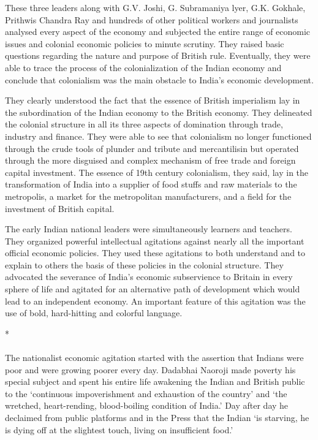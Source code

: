 These three leaders along with G.V. Joshi, G. Subramaniya lyer, G.K. Gokhale, Prithwis Chandra Ray and hundreds of other political workers and journalists analysed every aspect of the economy and subjected the entire range of economic issues and colonial economic policies to minute scrutiny. They raised basic questions regarding the nature and purpose of British rule. Eventually, they were able to trace the process of the colonialization of the Indian economy and conclude that colonialism was the main obstacle to India's economic development.

They clearly understood the fact that the essence of British imperialism lay in the subordination of the Indian economy to the British economy. They delineated the colonial structure in all its three aspects of domination through trade, industry and finance. They were able to see that colonialism no longer functioned through the crude tools of plunder and tribute and mercantilisin but operated through the more disguised and complex mechanism of free trade and foreign capital investment. The essence of 19th century colonialism, they said, lay in the transformation of India into a supplier of food stuffs and raw materials to the metropolis, a market for the metropolitan manufacturers, and a field for the investment of British capital.

The early Indian national leaders were simultaneously learners and teachers. They organized powerful intellectual agitations against nearly all the important official economic policies. They used these agitations to both understand and to explain to others the basis of these policies in the colonial structure. They advocated the severance of India's economic subservience to Britain in every sphere of life and agitated for an alternative path of development which would lead to an independent economy. An important feature of this agitation was the use of bold, hard-hitting and colorful language.

\begin{center}*\end{center}

\paragraph*{}

The nationalist economic agitation started with the assertion that Indians were poor and were growing poorer every day. Dadabhai Naoroji made poverty his special subject and spent his entire life awakening the Indian and British public to the `continuous impoverishment and exhaustion of the country' and `the wretched, heart-rending, blood-boiling condition of India.' Day after day he declaimed from public platforms and in the Press that the Indian `is starving, he is dying off at the slightest touch, living on insufficient food.'

